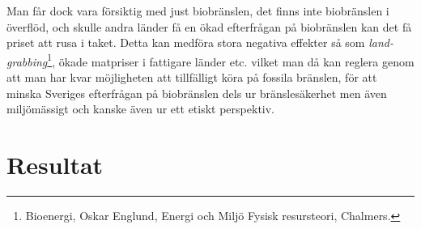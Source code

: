 \documentclass[a4paper,11pt,fleqn, titlepage]{article}
\begin{document}
Man får dock vara försiktig med just biobränslen, det finns inte
biobränslen i överflöd, och skulle andra länder få en ökad efterfrågan på
biobränslen kan det få priset att rusa i taket. Detta kan medföra stora
negativa effekter så som \emph{land-grabbing}\footnote{Bioenergi, Oskar
Englund, Energi och Miljö Fysisk resursteori, Chalmers.}, ökade matpriser i
fattigare länder etc. vilket man då kan reglera genom att man har kvar
möjligheten att tillfälligt köra på fossila bränslen, för att minska
Sveriges efterfrågan på biobränslen dels ur bränslesäkerhet men även
miljömässigt och kanske även ur ett etiskt perspektiv.
\section{Resultat}
\end{document}
